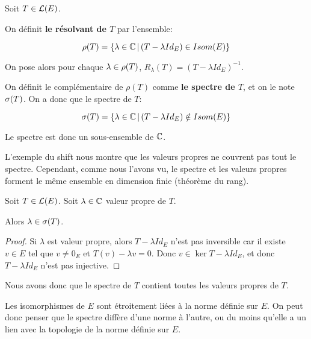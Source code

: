 \begin{definition}
	Soit $T \in \mathcal{L}(E)$.

	On définit \textbf{le résolvant de $T$} par l'ensemble:

	\begin{equation}
		\rho(T) = \left\{\lambda \in \mathbb{C} \, | \, (T - \lambda
			{Id}_{E}) \in Isom(E) \right\}
			\label{def:resolvant_operator}
	\end{equation}

	On pose alors pour chaque $\lambda \in \rho(T)$, $R_{\lambda}(T) = (T -
	\lambda Id_{E})^{-1}$.

	On définit le complémentaire de $\rho(T)$ comme \textbf{le spectre de $T$},
	et on le note $\sigma(T)$.
	On a donc que le spectre de $T$:

	\begin{equation}
		\sigma(T) = \left\{\lambda \in \mathbb{C} \, | \, (T - \lambda {Id}_{E})
		\notin Isom(E) \right\}
		\label{def:spectrum_operator}
	\end{equation}
\end{definition}

Le spectre est donc un sous-ensemble de $\mathbb{C}$.

L'exemple du shift nous montre que les valeurs propres ne couvrent pas tout le
spectre.
Cependant, comme nous l'avons vu, le spectre et les valeurs propres forment le
même ensemble en dimension finie (théorème du rang).

\begin{proposition}
	Soit $T \in \mathcal{L}(E)$.
	Soit $\lambda \in \mathbb{C}$ valeur propre de $T$.

	Alors $\lambda \in \sigma(T)$.
\end{proposition}

\begin{proof}
	Si $\lambda$ est valeur propre, alors $T - \lambda Id_{E}$ n'est pas
	inversible car il existe $v \in E$ tel que $v \neq 0_{E}$ et $T(v) - \lambda
	v = 0$. Donc $v \in \ker{T - \lambda Id_{E}}$, et donc $T - \lambda Id_{E}$
	n'est pas injective.
\end{proof}

Nous avons donc que le spectre de $T$ contient toutes les valeurs propres de
$T$.

Les isomorphismes de $E$ sont étroitement liées à la norme définie sur $E$. On
peut donc penser que le spectre diffère d'une norme à l'autre, ou du moins
qu'elle a un lien avec la topologie de la norme définie sur $E$.

